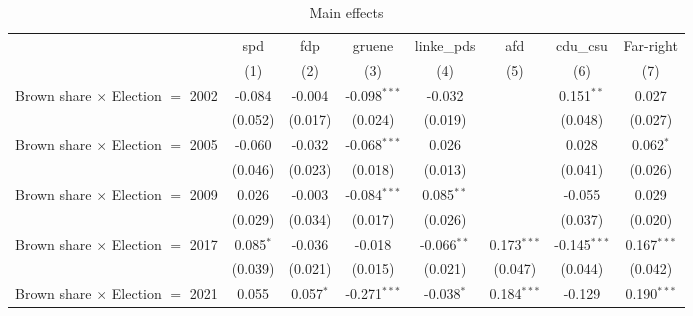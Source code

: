 \begin{table}[htbp]
   \caption{Main effects}
   \centering
   \begin{tabular}{lccccccc}
      \tabularnewline \midrule \midrule
                                                              & spd            & fdp            & gruene                 & linke\_pds     & afd            & cdu\_csu       & Far-right\\  
                                                              & (1)            & (2)            & (3)                    & (4)            & (5)            & (6)            & (7)\\  
      Brown share $\times$ Election $=$ 2002                  & -0.084         & -0.004         & -0.098$^{***}$         & -0.032         &                & 0.151$^{**}$   & 0.027\\   
                                                              & (0.052)        & (0.017)        & (0.024)                & (0.019)        &                & (0.048)        & (0.027)\\   
      Brown share $\times$ Election $=$ 2005                  & -0.060         & -0.032         & -0.068$^{***}$         & 0.026          &                & 0.028          & 0.062$^{*}$\\   
                                                              & (0.046)        & (0.023)        & (0.018)                & (0.013)        &                & (0.041)        & (0.026)\\   
      Brown share $\times$ Election $=$ 2009                  & 0.026          & -0.003         & -0.084$^{***}$         & 0.085$^{**}$   &                & -0.055         & 0.029\\   
                                                              & (0.029)        & (0.034)        & (0.017)                & (0.026)        &                & (0.037)        & (0.020)\\   
      Brown share $\times$ Election $=$ 2017                  & 0.085$^{*}$    & -0.036         & -0.018                 & -0.066$^{**}$  & 0.173$^{***}$  & -0.145$^{***}$ & 0.167$^{***}$\\   
                                                              & (0.039)        & (0.021)        & (0.015)                & (0.021)        & (0.047)        & (0.044)        & (0.042)\\   
      Brown share $\times$ Election $=$ 2021                  & 0.055          & 0.057$^{*}$    & -0.271$^{***}$         & -0.038$^{*}$   & 0.184$^{***}$  & -0.129         & 0.190$^{***}$\\   

\end{tabular}
\end{table}
